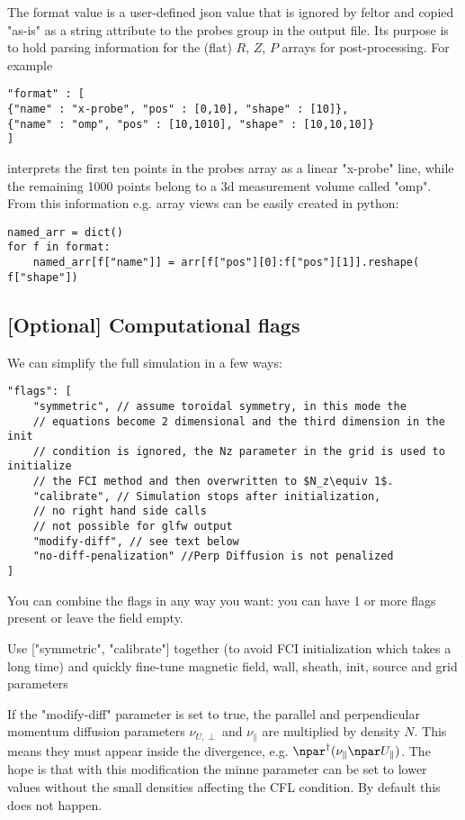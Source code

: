 The format value is a user-defined json value that is ignored by feltor and
copied "as-is" as a string attribute to the probes group in the output file.
Its purpose is to hold parsing information for the (flat) $R$, $Z$, $P$ arrays
for post-processing. For example
\begin{verbatim}
"format" : [
{"name" : "x-probe", "pos" : [0,10], "shape" : [10]},
{"name" : "omp", "pos" : [10,1010], "shape" : [10,10,10]}
]
\end{verbatim}
interprets the first ten points in the probes array as a linear "x-probe" line,
while the remaining 1000 points belong to a 3d measurement volume called "omp".
From this information e.g. array views can be easily created in python:
\begin{verbatim}
named_arr = dict()
for f in format:
    named_arr[f["name"]] = arr[f["pos"][0]:f["pos"][1]].reshape( f["shape"])
\end{verbatim}

\subsection{[Optional] Computational flags}
We can simplify the full simulation in a few ways:
\begin{verbatim}
"flags": [
    "symmetric", // assume toroidal symmetry, in this mode the
    // equations become 2 dimensional and the third dimension in the init
    // condition is ignored, the Nz parameter in the grid is used to initialize
    // the FCI method and then overwritten to $N_z\equiv 1$.
    "calibrate", // Simulation stops after initialization,
    // no right hand side calls
    // not possible for glfw output
    "modify-diff", // see text below
    "no-diff-penalization" //Perp Diffusion is not penalized
]
\end{verbatim}
You can combine the flags in any way you want: you can have 1 or more
flags present or leave the field empty.
\begin{tcolorbox}[title=Note]
    Use ["symmetric", "calibrate"] together (to avoid FCI initialization
    which takes a long time) and quickly fine-tune
    magnetic field, wall, sheath, init, source and grid parameters
\end{tcolorbox}
If the  "modify-diff" parameter is set to true, the parallel and perpendicular
momentum diffusion parameters $\nu_{U,\perp}$ and $\nu_\parallel$ are
multiplied by density $N$. This means they must appear inside the
divergence, e.g. $\npar^\dagger (\nu_{\parallel} \npar U_\parallel)$.
The hope is that with this modification the minne parameter can be set
to lower values without the small densities affecting the CFL condition.
By default this does not happen.


